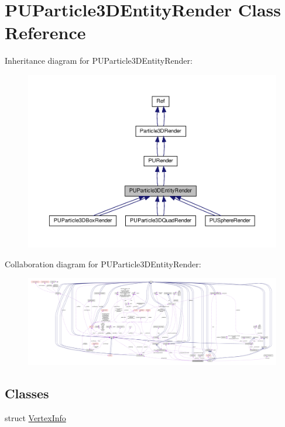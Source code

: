 \hypertarget{classPUParticle3DEntityRender}{}\section{P\+U\+Particle3\+D\+Entity\+Render Class Reference}
\label{classPUParticle3DEntityRender}


Inheritance diagram for P\+U\+Particle3\+D\+Entity\+Render\+:
\nopagebreak
\begin{figure}[H]
\begin{center}
\leavevmode
\includegraphics[width=350pt]{classPUParticle3DEntityRender__inherit__graph}
\end{center}
\end{figure}


Collaboration diagram for P\+U\+Particle3\+D\+Entity\+Render\+:
\nopagebreak
\begin{figure}[H]
\begin{center}
\leavevmode
\includegraphics[width=350pt]{classPUParticle3DEntityRender__coll__graph}
\end{center}
\end{figure}
\subsection*{Classes}
\begin{DoxyCompactItemize}
\item 
struct \hyperlink{structPUParticle3DEntityRender_1_1VertexInfo}{Vertex\+Info}
\end{DoxyCompactItemize}
